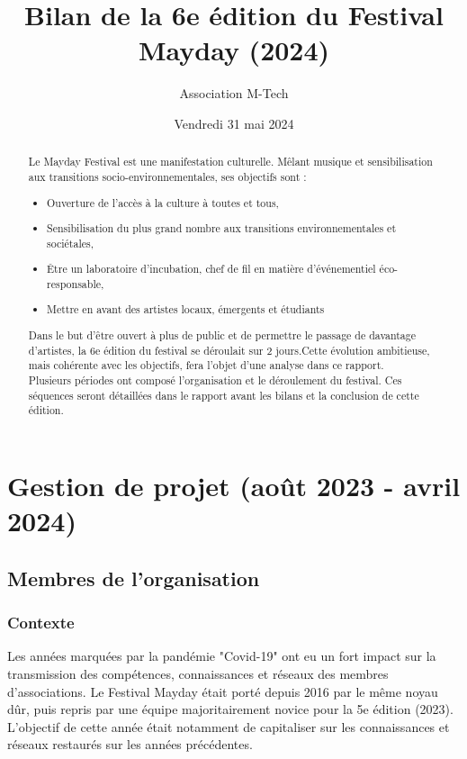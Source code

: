 \documentclass[12pt,a4paper]{report}
\title{Bilan de la 6e édition du Festival Mayday (2024)}
\author{Association M-Tech}
\date{Vendredi 31 mai 2024}
\begin{document}
\maketitle

\begin{abstract}
Le Mayday Festival est une manifestation culturelle. Mêlant musique et sensibilisation aux transitions socio-environnementales, ses objectifs sont :
\begin{itemize}
\item Ouverture de l'accès à la culture à toutes et tous,
\item Sensibilisation du plus grand nombre aux transitions environnementales et sociétales,
\item Être un laboratoire d'incubation, chef de fil en matière d'événementiel éco-responsable,
\item Mettre en avant des artistes locaux, émergents et étudiants
\end{itemize}
Dans le but d'être ouvert à plus de public et de permettre le passage de davantage d'artistes, la 6e édition du festival se déroulait sur 2 jours.Cette évolution ambitieuse, mais cohérente avec les objectifs, fera l'objet d'une analyse dans ce rapport. \\
Plusieurs périodes ont composé l'organisation et le déroulement du festival. Ces séquences seront détaillées dans le rapport avant les bilans et la conclusion de cette édition.
\end{abstract}

\part{Gestion de projet (août 2023 - avril 2024)}
\chapter{Membres de l'organisation}
\section{Contexte}
Les années marquées par la pandémie "Covid-19" ont eu un fort impact sur la transmission des compétences, connaissances et réseaux des membres d'associations. Le Festival Mayday était porté depuis 2016 par le même noyau dûr, puis repris par une équipe majoritairement novice pour la 5e édition (2023). L'objectif de cette année était notamment de capitaliser sur les connaissances et réseaux restaurés sur les années précédentes. 
\end{document}
